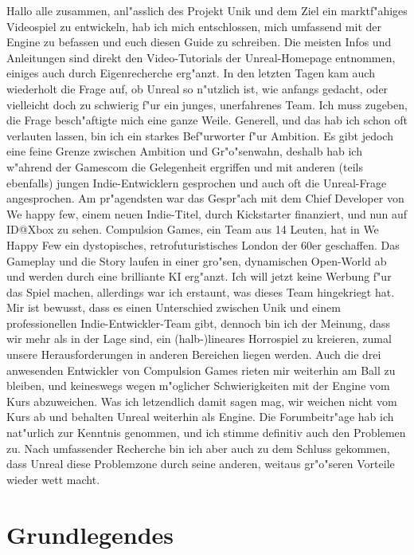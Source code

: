 \documentclass[11pt, titlepage]{article}
\begin{document}
\noindent Hallo alle zusammen, \newline
\noindent anl"asslich des Projekt Unik und dem Ziel ein marktf"ahiges Videospiel zu entwickeln, hab ich mich entschlossen, mich umfassend mit der Engine zu befassen und euch diesen Guide zu schreiben. Die meisten Infos und Anleitungen sind direkt den Video-Tutorials der Unreal-Homepage entnommen, einiges auch durch Eigenrecherche erg"anzt. In den letzten Tagen kam auch wiederholt die Frage auf, ob Unreal so n"utzlich ist, wie anfangs gedacht, oder vielleicht doch zu schwierig f"ur ein junges, unerfahrenes Team. Ich muss zugeben, die Frage besch"aftigte mich eine ganze Weile. Generell, und das hab ich schon oft verlauten lassen, bin ich ein starkes Bef"urworter f"ur Ambition. Es gibt jedoch eine feine Grenze zwischen Ambition und Gr"o"senwahn, deshalb hab ich w"ahrend der Gamescom die Gelegenheit ergriffen und mit anderen (teils ebenfalls) jungen Indie-Entwicklern gesprochen und auch oft die Unreal-Frage angesprochen. \newline
\noindent Am pr"agendsten war das Gespr"ach mit dem Chief Developer von We happy few, einem neuen Indie-Titel, durch Kickstarter finanziert, und nun auf ID@Xbox zu sehen. Compulsion Games, ein Team aus 14 Leuten, hat in We Happy Few ein dystopisches, retrofuturistisches London der 60er geschaffen. Das Gameplay und die Story laufen in einer gro"sen, dynamischen Open-World ab und werden durch eine brilliante KI erg"anzt. Ich will jetzt keine Werbung f"ur das Spiel machen, allerdings war ich erstaunt, was dieses Team hingekriegt hat. Mir ist bewusst, dass es einen Unterschied zwischen Unik und einem professionellen Indie-Entwickler-Team gibt, dennoch bin ich der Meinung, dass wir mehr als in der Lage sind, ein (halb-)lineares Horrospiel zu kreieren, zumal unsere Herausforderungen in anderen Bereichen liegen werden. Auch die drei anwesenden Entwickler von Compulsion Games rieten mir weiterhin am Ball zu bleiben, und keineswegs wegen m"oglicher Schwierigkeiten mit der Engine vom Kurs abzuweichen. \newline
\noindent Was ich letzendlich damit sagen mag, wir weichen nicht vom Kurs ab und behalten Unreal weiterhin als Engine. Die Forumbeitr"age hab ich nat"urlich zur Kenntnis genommen, und ich stimme definitiv auch den Problemen zu. Nach umfassender Recherche bin ich aber auch zu dem Schluss gekommen, dass Unreal diese Problemzone durch seine anderen, weitaus gr"o"seren Vorteile wieder wett macht.


\section{Grundlegendes}
\end{document}

